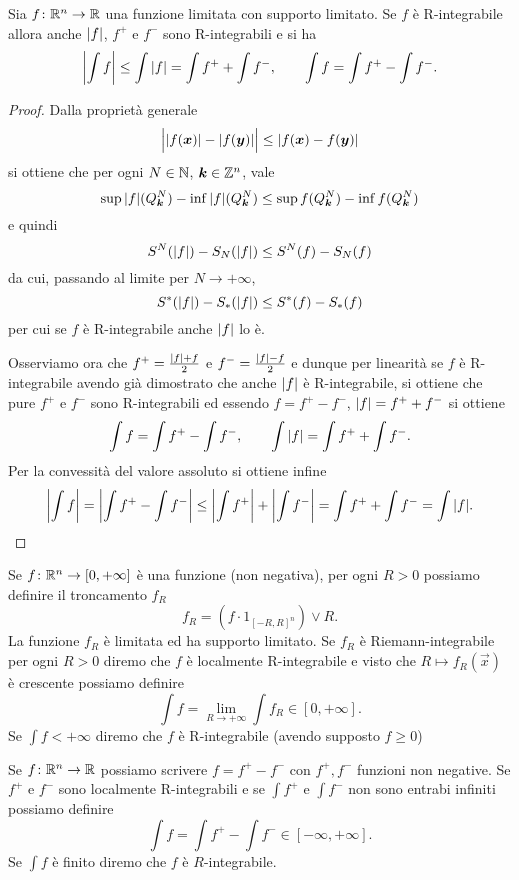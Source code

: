 \begin{theorem}
Sia $f\colon {\mathbb R}^n \to {\mathbb R}$ una funzione limitata con supporto limitato.
Se $f$ è R-integrabile allora anche ${\left|f\right|}$, $f^+$ e $f^-$ sono 
R-integrabili e si ha 
\[
  {\left|\int f\right|} \le \int {\left|f\right|} = \int f^+ + \int f^-, 
  \qquad 
 \int f = \int f^+ - \int f^-.
\]
\end{theorem}
\begin{proof}
Dalla proprietà generale 
\[
  \abs{\rule{0pt}{1.1em}\abs{f(\vec x)} - \abs{f(\vec y)}} \le \abs{f(\vec x) - f(\vec y)}
\]
si ottiene che per ogni $N\in {\mathbb N}$, $\boldsymbol k \in {\mathbb Z}^n$, vale
\[
  \sup {\left|f\right|}(Q^N_{\boldsymbol k}) - \inf {\left|f\right|}(Q^N_{\boldsymbol k})
  \le 
  \sup f(Q^N_{\boldsymbol k}) - \inf f(Q^N_{\boldsymbol k})
\]
e quindi 
\[
   S^N({\left|f\right|}) - S_N({\left|f\right|}) \le S^N(f) - S_N(f)
\] 
da cui, passando al limite per $N\to +\infty$,
\[
  S^*({\left|f\right|}) - S_*({\left|f\right|}) \le S^*(f) - S_*(f)
\]
per cui se $f$ è R-integrabile anche ${\left|f\right|}$ lo è.

Osserviamo ora che $f^+=\frac{{\left|f\right|} + f}{2}$ e $f^-=\frac{{\left|f\right|} - f}{2}$ 
e dunque per linearità se $f$ è R-integrabile avendo già dimostrato 
che anche ${\left|f\right|}$ è R-integrabile, si ottiene che pure $f^+
$ e $f^-$ sono R-integrabili ed essendo $f=f^+-f^-$, ${\left|f\right|} = f^+ + f^-$ si ottiene 
\[
  \int f = \int f^+ - \int f^-, \qquad 
  \int {\left|f\right|} = \int f^+ + \int f^-.
\]
Per la convessità del valore assoluto si ottiene infine
\[
 {\left|\int f\right|} = {\left|\int f^+ - \int f^-\right|} 
 \le {\left|\int f^+\right|} + {\left|\int f^-\right|}
 = \int f^+ + \int f^- = \int {\left|f\right|}.
\]
\end{proof}

\begin{definition}
Se $f\colon {\mathbb R}^n \to [0,+\infty]$ è una funzione (non negativa), per ogni $R>0$ 
possiamo definire il troncamento $f_R$ 
\[
  f_R = (f \cdot 1_{[-R,R]^n}) \vee R.
\]
La funzione $f_R$ è limitata ed ha supporto limitato.
Se $f_R$ è Riemann-integrabile per ogni $R>0$ diremo che $f$ è localmente R-integrabile 
e visto che $R\mapsto f_R(\vec x)$ è crescente possiamo definire
\[
 \int f = \lim_{R\to+\infty} \int f_R \in [0,+\infty].
\]
Se $\int f<+\infty$ diremo che $f$ è R-integrabile (avendo supposto $f\ge 0$)

Se $f\colon {\mathbb R}^n\to {\mathbb R}$ possiamo scrivere $f= f^+-f^-$ con $f^+,f^-$ funzioni non negative.
Se $f^+$ e $f^-$ sono localmente R-integrabili e se 
$\int f^+$ e $\int f^-$ non sono entrabi infiniti possiamo definire 
\[
  \int f = \int f^+ - \int f^- \in [-\infty,+\infty].
\]
Se $\int f$ è finito diremo che $f$ è $R$-integrabile.
\end{definition}

